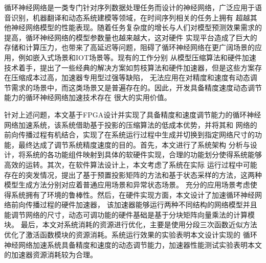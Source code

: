 	
\begin{chineseabstract}
循环神经网络是一类专门针对序列数据处理任务而设计的神经网络，广泛应用于语音识别，机器翻译和动态系统建模等领域，在时间序列相关的任务上拥有
超越其他神经网络模型的性能表现。随着任务复杂度的增长与人们对模型预测效果需求的提高，循环神经网络的模型参数量也越来越大，这对硬件
实现平台造成了巨大的存储和计算压力，也带来了高延迟等问题，阻碍了循环神经网络在更广阔场景的应用，例如嵌入式场景和IOT场景等。现有的工作分别
从模型压缩算法和硬件加速技术着手，提出了一些经典的解决方案如剪枝算法和硬件加速器，但是这些方案存在压缩成本过高，加速器专用型过强等缺陷，
无法应用在对精度和速度有动态调节需求的场景中，而这类场景又是普遍存在的。因此，开发具备精度速度动态调节能力的循环神经网络加速技术存在
很大的实用价值。

针对上述问题，本文基于FPGA设计并实现了具备精度和速度调节能力的循环神经网络加速系统，该系统借助基于投影的压缩算法的低成本优势，并将其和
网络的前向传播过程有机结合，实现了在系统运行过程中生成并切换到指定网络尺寸的功能，最终达成了调节系统精度速度的目的。首先，本文进行了系统架构
分析与设计，将系统的各功能组件映射到具体的软硬件实现，合理的功能划分使得系统能够高效的运转。其次，在软件算法设计上，本文考虑了系统在实际
运行过程中可能存在的突发情况，提出了基于预置投影矩阵的方法和基于状态采样的方法，这两种模型生成方法分别对应着普通应用场景和异常状态场景。
充分的应用场景考虑使得系统拥有了环境的鲁棒性。然后，在硬件实现方面，本文设计了加速循环神经网络前向传播过程的硬件加速器，
该加速器能够运行两种不同结构的网络模型并且能调节网络的尺寸，动态可调功能的硬件基础是基于分块矩阵向量乘法的计算模块。
最后，本文对系统消耗的资源进行优化，主要是使用分段三次函数近似方法优化了激活函数模块的资源消耗。系统运行效果的实验表明本文设计实现的
循环神经网络加速系统具备精度和速度的动态调节能力，加速器性能测试实验表明本文的加速器资源消耗较为合理。



\end{chineseabstract}
